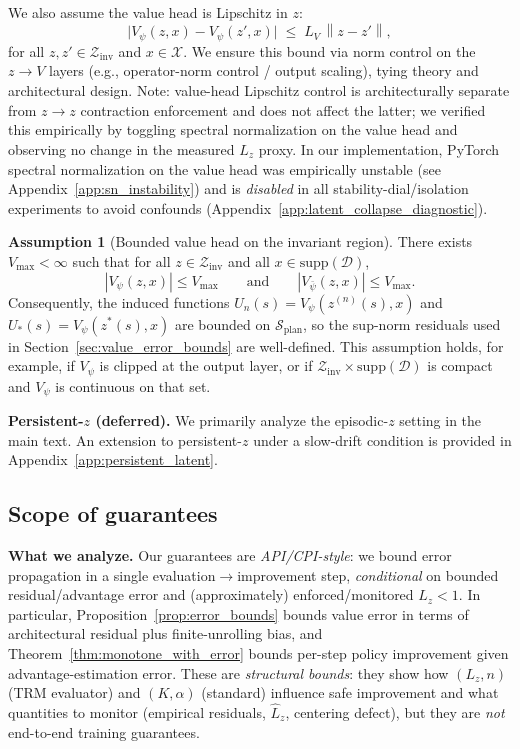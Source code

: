 \documentclass{article}
\theoremstyle{plain}
\theoremstyle{definition}
\newtheorem{assumption}[theorem]{Assumption}
\theoremstyle{remark}
\newcommand{\XX}{\mathcal{X}}
\newcommand{\SSS}{\mathcal{S}}
\newcommand{\norm}[1]{\left\lVert #1 \right\rVert}
\begin{document}
{We also assume the value head is Lipschitz in $z$:
\begin{equation}
\bigl|V_\psi(z,x)-V_\psi(z',x)\bigr|
\;\le\;
L_V\,\norm{z-z'},
\label{eq:LV_def}
\end{equation}
for all $z,z'\in\mathcal{Z}_{\mathrm{inv}}$ and $x\in\XX$.
We ensure this bound via norm control on the $z \to V$ layers (e.g., operator-norm control / output scaling), tying theory and architectural design.
Note: value-head Lipschitz control is architecturally separate from $z\!\to\!z$ contraction enforcement and does not affect the latter; we verified this empirically by toggling spectral normalization on the value head and observing no change in the measured $\hat L_z$ proxy.
In our implementation, PyTorch spectral normalization on the value head was empirically unstable (see Appendix~\ref{app:sn_instability}) and is \emph{disabled} in all stability-dial/isolation experiments to avoid confounds (Appendix~\ref{app:latent_collapse_diagnostic}).
\begin{assumption}[Bounded value head on the invariant region]
\label{ass:bounded_value_head}
There exists $V_{\max}<\infty$ such that for all $z\in\mathcal{Z}_{\mathrm{inv}}$ and all
$x \in \mathrm{supp}(\mathcal{D})$,
\[
|V_\psi(z,x)| \le V_{\max}
\qquad\text{and}\qquad
|V_{\bar\psi}(z,x)| \le V_{\max}.
\]
Consequently, the induced functions $U_n(s)=V_\psi(z^{(n)}(s),x)$ and
$U_*(s)=V_\psi(z^*(s),x)$ are bounded on $\SSS_{\mathrm{plan}}$,
so the sup-norm residuals used in Section~\ref{sec:value_error_bounds} are well-defined.
This assumption holds, for example, if $V_\psi$ is clipped at the output layer, or if
$\mathcal{Z}_{\mathrm{inv}}\times \mathrm{supp}(\mathcal{D})$ is compact and $V_\psi$ is continuous on that set.
\end{assumption}

\textbf{Persistent-$z$ (deferred).}
We primarily analyze the episodic-$z$ setting in the main text.
An extension to persistent-$z$ under a slow-drift condition is provided in Appendix~\ref{app:persistent_latent}.
}%

\subsection{Scope of guarantees}
\label{sec:scope}

\textbf{What we analyze.}
Our guarantees are \emph{API/CPI-style}: we bound error propagation in a single evaluation$\rightarrow$improvement step, \emph{conditional} on bounded residual/advantage error and (approximately) enforced/monitored $L_z<1$.
In particular, Proposition~\ref{prop:error_bounds} bounds value error in terms of architectural residual plus finite-unrolling bias, and Theorem~\ref{thm:monotone_with_error} bounds per-step policy improvement given advantage-estimation error.
These are \emph{structural bounds}: they show how $(L_z,n)$ (TRM evaluator) and $(K,\alpha)$ (standard) influence safe improvement and what quantities to monitor (empirical residuals, $\hat L_z$, centering defect), but they are \emph{not} end-to-end training guarantees.
\end{document}
